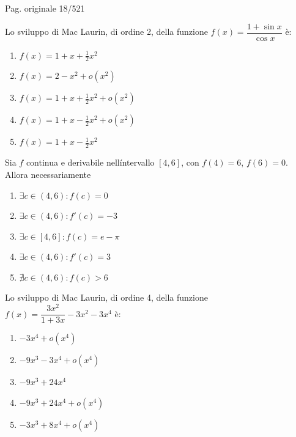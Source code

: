 \par\noindent\hfill{\color{cyan!65!black}\scriptsize Pag. originale 18/521}\par\smallskip

\begin{quiz}
Lo sviluppo di Mac Laurin, di ordine 2, della funzione $f(x)=\dfrac{1+\sin x}{\cos x}$ \`e:
\begin{enumerate}[label=\alph*),leftmargin=1.3cm,itemsep=3pt,topsep=5pt]
\item $f(x)=1+x+\frac12x^2$
\item $f(x)=2-x^2+o(x^2)$
\item $f(x)=1+x+\frac12x^2+o(x^2)$
\item $f(x)=1+x-\frac12x^2+o(x^2)$
\item $f(x)=1+x-\frac12x^2$
\end{enumerate}
\end{quiz}

\begin{quiz}
Sia $f$ continua e derivabile nell\'intervallo $[4,6]$, con $f(4)=6$, $f(6)=0$. Allora necessariamente
\begin{enumerate}[label=\alph*),leftmargin=1.3cm,itemsep=3pt,topsep=5pt]
\item $\exists c\in(4,6):f(c)=0$
\item $\exists c\in(4,6):f\prime(c)=-3$
\item $\exists c\in[4,6]:f(c)=e-\pi$
\item $\exists c\in(4,6):f\prime(c)=3$
\item $\nexists c\in(4,6):f(c)>6$
\end{enumerate}
\end{quiz}

\begin{quiz}
Lo sviluppo di Mac Laurin, di ordine 4, della funzione $f(x)=\dfrac{3x^2}{1+3x}-3x^2-3x^4$ \`e:
\begin{enumerate}[label=\alph*),leftmargin=1.3cm,itemsep=3pt,topsep=5pt]
\item $-3x^4+o(x^4)$
\item $-9x^3-3x^4+o(x^4)$
\item $-9x^3+24x^4$
\item $-9x^3+24x^4+o(x^4)$
\item $-3x^3+8x^4+o(x^4)$
\end{enumerate}
\end{quiz}

